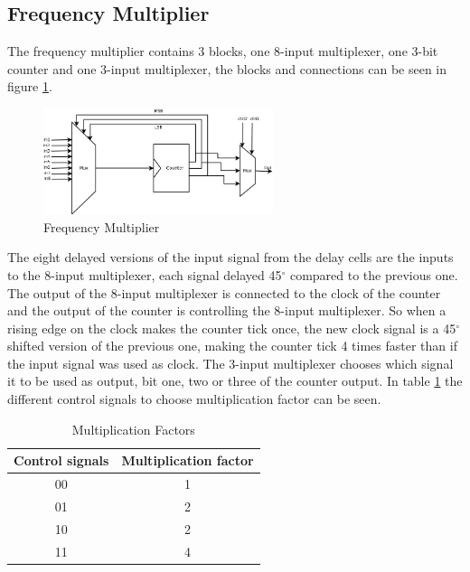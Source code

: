 \documentclass[a4paper,12pt]{article} \usepackage{graphicx}
\newcommand{\degree}{\ensuremath{^\circ}}
\begin{document}
\subsection{Frequency Multiplier}
The frequency multiplier contains 3 blocks, one 8-input multiplexer, one 3-bit
counter and one 3-input multiplexer, the blocks and connections can be seen in 
figure \ref{fig:freq_mult}.
\begin{figure}[h!b]
        \centering
        \includegraphics[width=0.6\textwidth]{../Bilder/freq_mult_high.png}
        \caption{Frequency Multiplier}
        \label{fig:freq_mult}
\end{figure}
The eight delayed versions of the input signal from the delay cells
are the inputs to the 8-input multiplexer, each signal delayed 45\degree 
compared to the previous one. The output of the 8-input multiplexer is 
connected to the clock of the counter and the output of the counter is 
controlling the 8-input multiplexer. So when a rising edge on the clock
makes the counter tick once, the new clock signal is a 45\degree shifted
version of the previous one, making the counter tick 4 times faster than
if the input signal was used as clock. The 3-input multiplexer chooses which 
signal it to be used as output, bit one, two or three of the counter output. 
In table \ref{tab:mult_fact} the different control signals to choose 
multiplication factor can be seen.
\begin{table}[h!]
        \centering
        \begin{tabular}{|c|c|}
                \hline
                \textbf{Control signals} & \textbf{Multiplication factor} \\
                \hline
                00 & 1 \\
                01 & 2 \\
                10 & 2 \\
                11 & 4 \\
                \hline
        \end{tabular}
        \caption{Multiplication Factors}
        \label{tab:mult_fact}
\end{table}
\end{document}
